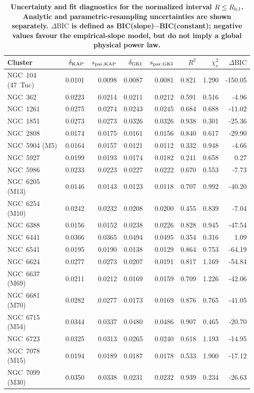 \begin{table}
\centering
\caption{\textbf{Uncertainty and fit diagnostics for the normalized interval $R\leq R_{\rm h,l}$. Analytic and parametric-resampling uncertainties are shown separately. $\Delta\mathrm{BIC}$ is defined as BIC(slope)$-$BIC(constant); negative values favour the empirical-slope model, but do not imply a global physical power law.}}
\label{tab:robustness}
\scriptsize
\setlength{\tabcolsep}{4pt}
\begin{tabular}{lrrrrrrr}
\hline
Cluster & $\delta_{\rm KAP}$ & $s_{\rm par,KAP}$ & $\delta_{\rm GKI}$ & $s_{\rm par,GKI}$ & $R^2$ & $\chi^2_\nu$ & $\Delta\mathrm{BIC}$ \\
\hline
NGC~104 (47~Tuc) & 0.0101 & 0.0098 & 0.0087 & 0.0081 & 0.821 & 1.290 & -150.05 \\
NGC~362 & 0.0223 & 0.0214 & 0.0211 & 0.0212 & 0.591 & 0.516 & -4.96 \\
NGC~1261 & 0.0275 & 0.0274 & 0.0243 & 0.0245 & 0.684 & 0.688 & -11.02 \\
NGC~1851 & 0.0273 & 0.0273 & 0.0326 & 0.0326 & 0.938 & 0.301 & -25.36 \\
NGC~2808 & 0.0174 & 0.0175 & 0.0161 & 0.0156 & 0.840 & 0.617 & -29.90 \\
NGC~5904 (M5) & 0.0164 & 0.0157 & 0.0121 & 0.0112 & 0.332 & 0.948 & -4.66 \\
NGC~5927 & 0.0199 & 0.0193 & 0.0174 & 0.0182 & 0.241 & 0.658 & 0.27 \\
NGC~5986 & 0.0233 & 0.0223 & 0.0227 & 0.0222 & 0.670 & 0.553 & -7.73 \\
NGC~6205 (M13) & 0.0146 & 0.0143 & 0.0123 & 0.0118 & 0.707 & 0.992 & -40.20 \\
NGC~6254 (M10) & 0.0242 & 0.0232 & 0.0208 & 0.0200 & 0.455 & 0.839 & -7.04 \\
NGC~6388 & 0.0156 & 0.0152 & 0.0238 & 0.0226 & 0.828 & 0.945 & -47.54 \\
NGC~6441 & 0.0366 & 0.0365 & 0.0494 & 0.0495 & 0.354 & 0.316 & 1.09 \\
NGC~6541 & 0.0195 & 0.0190 & 0.0138 & 0.0129 & 0.864 & 0.753 & -64.19 \\
NGC~6624 & 0.0277 & 0.0273 & 0.0207 & 0.0191 & 0.817 & 1.169 & -54.84 \\
NGC~6637 (M69) & 0.0211 & 0.0212 & 0.0169 & 0.0159 & 0.709 & 1.226 & -42.06 \\
NGC~6681 (M70) & 0.0282 & 0.0277 & 0.0173 & 0.0169 & 0.876 & 0.765 & -41.05 \\
NGC~6715 (M54) & 0.0344 & 0.0337 & 0.0480 & 0.0486 & 0.907 & 0.465 & -20.70 \\
NGC~6723 & 0.0325 & 0.0313 & 0.0265 & 0.0240 & 0.618 & 1.193 & -14.95 \\
NGC~7078 (M15) & 0.0194 & 0.0189 & 0.0187 & 0.0178 & 0.533 & 1.900 & -17.12 \\
NGC~7099 (M30) & 0.0350 & 0.0338 & 0.0231 & 0.0232 & 0.939 & 0.234 & -26.63 \\
\hline
\end{tabular}
\end{table}